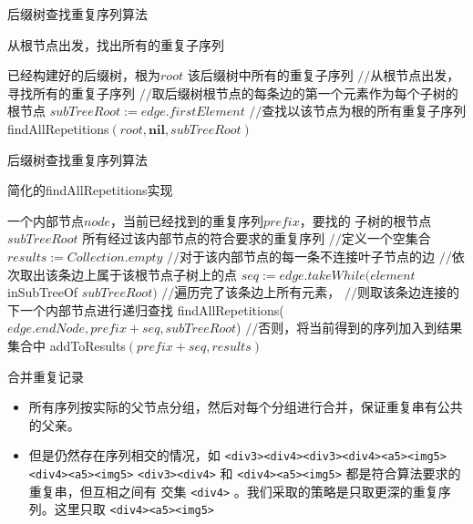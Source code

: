 \documentclass[presentation]{beamer}
\begin{document}
\begin{frame}[label=sec-2-9]{后缀树查找重复序列算法}
\begin{algorithm}[H]
  \caption{从根节点出发，找出所有的重复子序列\label{suffixtree:algo:fromroot}}
  \begin{algorithmic}[1]
    \Require 已经构建好的后缀树，根为$root$
    \Ensure 该后缀树中所有的重复子序列
    \State $//$从根节点出发，寻找所有的重复子序列
    \State $//$取后缀树根节点的每条边的第一个元素作为每个子树的根节点
    \State $subTreeRoot := edge.firstElement$
    \State $//$查找以该节点为根的所有重复子序列
    \State findAllRepetitions$(root, \mathbf{nil}, subTreeRoot)$
    \EndFor
  \end{algorithmic}
\end{algorithm}
\end{frame}

\begin{frame}[label=sec-2-10]{后缀树查找重复序列算法}
  \begin{algorithm}[H]
  \caption{\tiny 简化的findAllRepetitions实现}
  \label{suffixtree:algo:findrep}
  \begin{algorithmic}
    \tiny
    \Require 一个内部节点$node$，当前已经找到的重复序列$prefix$，要找的
    子树的根节点$subTreeRoot$
    \Ensure 所有经过该内部节点的符合要求的重复序列
    \State $//$定义一个空集合
    \State $results := Collection.empty$
    \State $//$对于该内部节点的每一条不连接叶子节点的边
    \State $//$依次取出该条边上属于该根节点子树上的点
    \State $seq := edge.takeWhile(element$ inSubTreeOf $subTreeRoot)$\label{suffixtree:code:equals}
    \State $//$遍历完了该条边上所有元素，
    \State $//$则取该条边连接的下一个内部节点进行递归查找
    \State findAllRepetitions($edge.endNode, prefix + seq, subTreeRoot$)
    \Else
    \State $//$否则，将当前得到的序列加入到结果集合中
    \State addToResults$(prefix + seq, results)$\label{suffixtree:code:add}
    \EndIf
    \EndFor
    \State {}
    \EndFunction
    \State
  \end{algorithmic}
\end{algorithm}
\end{frame}

\begin{frame}[fragile,label=sec-2-11]{合并重复记录}
 \begin{itemize}
\item 所有序列按实际的父节点分组，然后对每个分组进行合并，保证重复串有公共的父亲。
\item 但是仍然存在序列相交的情况，如
\scriptsize
\texttt{<div3><div4><div3><div4><a5><img5><div4><a5><img5>}
\normalsize
\texttt{<div3><div4>} 和 \texttt{<div4><a5><img5>} 都是符合算法要求的重复串，但互相之间有
交集 \texttt{<div4>} 。我们采取的策略是只取更深的重复序列。这里只取 \texttt{<div4><a5><img5>}
\end{itemize}
\end{frame}
\end{document}
